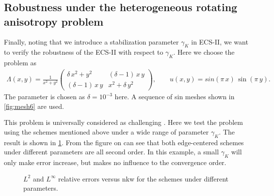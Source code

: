 \documentclass[times,review,preprint]{elsarticle}
\begin{document}
\subsection{Robustness under the heterogeneous rotating anisotropy problem}

Finally, noting that we introduce a stabilization parameter $\gamma_K$ in ECS-II, we want to verify the robustness of the ECS-II with respect to $\gamma_K$. Here we choose the problem as
\begin{align*}
\Lambda(x,y) = 
\frac{1}{x^2 + y^2}
\left(
\begin{matrix}
\delta \, x^2 + y^2 & (\delta-1) \, x \, y \\
(\delta-1) \, x \, y  & x^2 + \delta \, y^2
\end{matrix}
\right),
\qquad
u(x,y) = sin(\pi \, x) \, \sin(\pi \, y).
\end{align*}
The parameter is chosen as $\delta = 10^{-3}$ here. A sequence of sin meshes shown in \cref{fig:mesh6} are used.

This problem is universally considered as challenging \cite{Potier-CL, Terekhov2017}. Here we test the problem using the schemes mentioned above under a wide range of parameter $\gamma_K$. The result is shown in \cref{fig:error}. From the figure on can see that both edge-centered schemes under different parameters are all second order. In this example, a small $\gamma_K$ will only make error increase, but makes no influence to the convergence order.

\begin{figure}[h]
\centering
{}
\caption{$L^2$ and $L^\infty$ relative errors versus nkw for the schemes under different parameters.}
\label{fig:error}
\end{figure}
\end{document}
